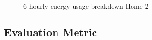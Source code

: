 \documentclass[conference]{IEEEtran}
\begin{document}
\begin{figure} 
	
  	\caption{6 hourly energy usage breakdown Home 2}
    \label{fig:breakdown}
\end{figure}

\subsection{Evaluation Metric}
\end{document}
